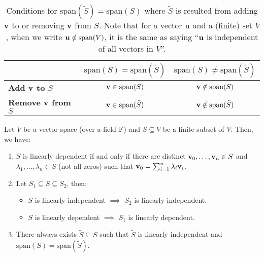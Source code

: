 \begin{table}[ht!]
    \begin{center}
    \begin{tabular}{@{}lcc@{}}
	\toprule
	                               & \multicolumn{1}{c}{\textbf{$\mathrm{span}(S)=\mathrm{span}(\tilde S)$}} & \multicolumn{1}{c}{\textbf{$\mathrm{span}(S)\ne\mathrm{span}(\tilde S)$}} \\ \midrule
	\textbf{Add ${\bf v}$ to $S$}      & ${\bf v}\in\mathrm{span}(S)$                                                & ${\bf v}\notin\mathrm{span}(S)$                                               \\
	\textbf{Remove ${\bf v}$ from $S$} & ${\bf v}\in\mathrm{span}(\tilde S)$                                         & ${\bf v}\notin\mathrm{span}(\tilde S)$                                        \\ \bottomrule
	\end{tabular}
    \caption{Conditions for $\mathrm{span}(\tilde S) = \mathrm{span}(S)$ where $\tilde S$ is resulted from adding ${\bf v}$ to or removing ${\bf v}$ from $S$. Note that for a vector ${\bf u}$ and a (finite) set $V$, when we write ${\bf u}\notin\mathrm{span}(V)$, it is the same as saying ``${\bf u}$ is independent of all vectors in $V$''.}
    \end{center}
\end{table}

\begin{definition}
	Let $V$ be a vector space (over a field $\mathbb{F}$) and $S\subseteq V$ be a finite subset of $V$. Then, we have:
	\begin{enumerate}
		\item $S$ is linearly dependent if and only if there are distinct ${\bf v}_0, \dots, {\bf v}_n\in S$ and $\lambda_1, \dots, \lambda_n\in S$ (not all zeros) such that ${\bf v}_0 = \sum_{i=1}^n\lambda_i{\bf v}_i$.
		\item Let $S_1 \subseteq S \subseteq S_2$, then:
		\begin{itemize}
			\item $S$ is linearly independent $\implies$ $S_2$ is linearly independent.
			\item $S$ is linearly dependent $\implies$ $S_1$ is linearly dependent.	
		\end{itemize} 

		\item There always exists $\tilde S \subseteq S$ such that $\tilde S$ is linearly independent and $\mathrm{span}(S) = \mathrm{span}(\tilde S)$.
	\end{enumerate} 
\end{definition} 

